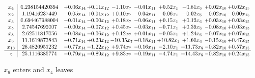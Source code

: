 \documentclass[9pt]{article}
\begin{document}
 \[\begin{array}{c| c c@{\hskip 2pt} c@{\hskip 2pt} c@{\hskip 2pt} c@{\hskip 2pt} c@{\hskip 2pt} c@{\hskip 2pt} c@{\hskip 2pt} c@{\hskip 2pt} }
 x_{4}   &  0.238154420394 & +  0.06 x_{14} & +  0.11 x_{12} & -1.10 x_{7} & -0.01 x_{11} & +  0.52 x_{1} & -0.81 x_{6} & +  0.02 x_{10} & +  0.02 x_{15}\\
 x_{2}   &  1.19416237449 & -0.05 x_{14} & +  0.01 x_{12} & +  0.10 x_{7} & -0.04 x_{11} & -0.06 x_{1} & -0.02 x_{6} & -0.02 x_{10} & -0.00 x_{15}\\
 x_{3}   &  0.694467988004 & -0.01 x_{14} & -0.00 x_{12} & +  0.18 x_{7} & -0.06 x_{11} & +  0.15 x_{1} & +  0.12 x_{6} & +  0.03 x_{10} & +  0.03 x_{15}\\
 x_{5}   &  2.74547692007 & -0.00 x_{14} & -0.07 x_{12} & +  0.45 x_{7} & -0.03 x_{11} & -0.71 x_{1} & +  0.39 x_{6} & -0.08 x_{10} & +  0.03 x_{15}\\
 x_{8}   &  2.62511817056 & -0.08 x_{14} & -0.06 x_{12} & +  0.12 x_{7} & +  0.01 x_{11} & -0.05 x_{1} & +  1.24 x_{6} & -0.07 x_{10} & +  0.07 x_{15}\\
 x_{9}   &  11.1619873843 & -0.71 x_{14} & +  0.23 x_{12} & -10.35 x_{7} & -0.18 x_{11} & + 10.82 x_{1} & +  1.60 x_{6} & -0.15 x_{10} & +  0.47 x_{15}\\
 x_{13}   &  28.4820951232 & -0.77 x_{14} & -1.22 x_{12} & +  9.74 x_{7} & -0.16 x_{11} & -2.10 x_{1} & + 11.73 x_{6} & -0.82 x_{10} & +  0.57 x_{15}\\
\hline
z    &  25.1116385774 & -0.79 x_{14} & -0.89 x_{12} & +  9.83 x_{7} & -0.19 x_{11} & -4.74 x_{1} & + 14.43 x_{6} & -0.82 x_{10} & +  0.24 x_{15}\\
\end{array}\]


 $ x_{6} $ enters and $ x_{4} $ leaves 
\end{document}
